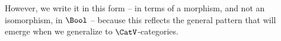 However, we write it in this form -- in terms of a morphism, and not an isomorphism, in $\Bool$ -- because this reflects the general pattern that will emerge when we generalize to $\CatV$-categories.

\begin{comment}
\begin{ctdefinition}
    \label{def:bool-functor}
    A $\Bool$-functor $\funa \colon \CatE \fto \CatF$ between $\Bool$-categories is:

    \constit
    \begin{enumerate}
        \item a function $\funa \colon \Ob_\CatE \to \Ob_\CatF$;
        \item for every pair of objects $\tup{\Obja, \Objb}$ of $\CatE$, a morphism in $\Bool$ of the type
              \begin{equation}
                  \CatE(\Obja, \Objb) \leq \CatF(\funa \Obja, \funa \Objb).
              \end{equation}
    \end{enumerate}
\end{ctdefinition}

\begin{ctdefinition}
    \label{def:bool-cat-opposite}
    Let $\CatE$ be a $\Bool$-category.
    Its opposite $\CatE\op$ is the $\Bool$-category with
    \begin{enumerate}
        \item $\Ob_{\CatE\op} = \Ob_\CatE$;
        \item $\CatE\op(\Obja, \Objb) = \CatE(\Objb, \Obja)$.
    \end{enumerate}

    The morphisms
    \begin{equation}
        \CatE\op(\Obja, \Objb) \wedge \CatE\op(\Objb, \Objc) \leq \CatE\op(\Obja, \Objc)
    \end{equation}
    and
    \begin{equation}
        \true \leq \CatE\op(\Obja, \Obja)
    \end{equation}
    are determined from $\CatE$.
\end{ctdefinition}


\end{comment}
